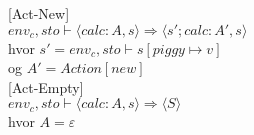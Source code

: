 [Act-New]\\
	$env_c, sto \vdash \langle calc:A, s \rangle \Rightarrow \langle s'; calc:A', s \rangle$\\
	hvor $s' = env_c, sto \vdash s[piggy \mapsto v]$\\
	og $A' = Action[new]$\\
	
[Act-Empty]\\
	$env_c, sto \vdash \langle calc:A, s \rangle \Rightarrow \langle S \rangle$\\
	hvor $A = \varepsilon$
	
\pagebreak
